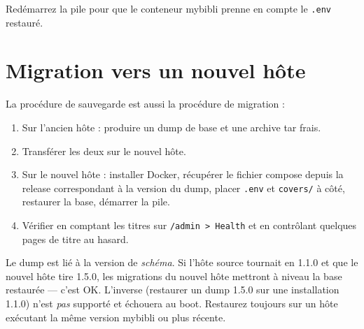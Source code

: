 Redémarrez la pile pour que le conteneur mybibli prenne en compte
le \texttt{.env} restauré.

\section{Migration vers un nouvel hôte}

La procédure de sauvegarde est aussi la procédure de migration :

\begin{enumerate}
  \item Sur l'ancien hôte : produire un dump de base et une archive
        tar frais.
  \item Transférer les deux sur le nouvel hôte.
  \item Sur le nouvel hôte : installer Docker, récupérer le fichier
        compose depuis la release correspondant à la version du
        dump, placer \texttt{.env} et \texttt{covers/} à côté,
        restaurer la base, démarrer la pile.
  \item Vérifier en comptant les titres sur \texttt{/admin >
        Health} et en contrôlant quelques pages de titre au
        hasard.
\end{enumerate}

\begin{warning}
Le dump est lié à la version de \emph{schéma}. Si l'hôte source
tournait en 1.1.0 et que le nouvel hôte tire 1.5.0, les migrations
du nouvel hôte mettront à niveau la base restaurée — c'est OK.
L'inverse (restaurer un dump 1.5.0 sur une installation 1.1.0)
n'est \emph{pas} supporté et échouera au boot. Restaurez toujours
sur un hôte exécutant la même version mybibli ou plus récente.
\end{warning}
